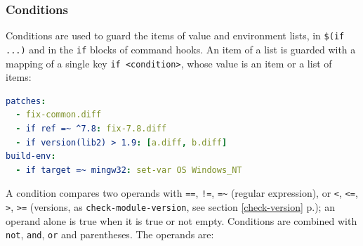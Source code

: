\documentclass[a4paper,12pt,twoside]{article}
\newcommand{\code}[1]{\texttt{#1}}
\newcommand{\seeref}[1]{see section \ref{#1} p.\pageref{#1}}
\begin{document}
\subsubsection{Conditions}
\label{yaml-conditions}

Conditions are used to guard the items of value and environment lists, in
\code{\$(if ...)} and in the \code{if} blocks of command hooks. An item of
a list is guarded with a mapping of a single key \code{if <condition>},
whose value is an item or a list of items:

\begin{lstlisting}[language=yaml]
patches:
  - fix-common.diff
  - if ref =~ ^7.8: fix-7.8.diff
  - if version(lib2) > 1.9: [a.diff, b.diff]
build-env:
  - if target =~ mingw32: set-var OS Windows_NT
\end{lstlisting}

A condition compares two operands with \code{==}, \code{!=},
\code{=\textasciitilde} (regular expression), or \code{<}, \code{<=},
\code{>}, \code{>=} (versions, as \code{check-module-version},
\seeref{check-version}); an operand alone is true when it is true or not
empty. Conditions are combined with \code{not}, \code{and}, \code{or} and
parentheses. The operands are:
\end{document}
